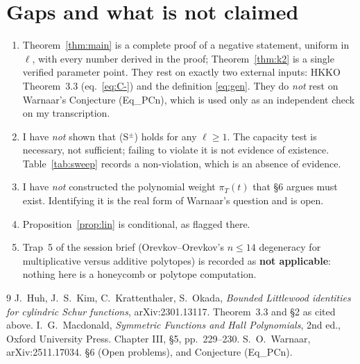 \documentclass[11pt]{article}
\theoremstyle{definition}
\begin{document}
\section{Gaps and what is not claimed}

\begin{enumerate}
\item Theorem~\ref{thm:main} is a complete proof of a negative statement, uniform in
$\ell$, with every number derived in the proof; Theorem~\ref{thm:k2} is a
single verified parameter point. They rest on exactly two external inputs:
HKKO Theorem~3.3 (eq.~\eqref{eq:C-}) and the definition \eqref{eq:gen}. They do
\emph{not} rest on Warnaar's Conjecture (Eq\_PCn), which is used only as an
independent check on my transcription.
\item I have \emph{not} shown that (S$^\pm$) holds for any $\ell\ge1$. The
capacity test is necessary, not sufficient; failing to violate it is not
evidence of existence. Table~\ref{tab:sweep} records a non-violation, which is
an absence of evidence.
\item I have \emph{not} constructed the polynomial weight $\pi_T(t)$ that
\S6 argues must exist. Identifying it is the real form of Warnaar's question
and is open.
\item Proposition~\ref{prop:lin} is conditional, as flagged there.
\item Trap~5 of the session brief (Orevkov--Orevkov's $n\le14$ degeneracy for
multiplicative versus additive polytopes) is recorded as \textbf{not
applicable}: nothing here is a honeycomb or polytope computation.
\end{enumerate}

\begin{thebibliography}{9}
 J.~Huh, J.~S.~Kim, C.~Krattenthaler, S.~Okada,
\emph{Bounded Littlewood identities for cylindric Schur functions},
arXiv:2301.13117. Theorem~3.3 and \S2 as cited above.
 I.~G.~Macdonald, \emph{Symmetric Functions and Hall Polynomials},
2nd ed., Oxford University Press. Chapter III, \S5, pp.~229--230.
 S.~O.~Warnaar, arXiv:2511.17034. \S6 (Open problems), and
Conjecture (Eq\_PCn).
\end{thebibliography}
\end{document}
